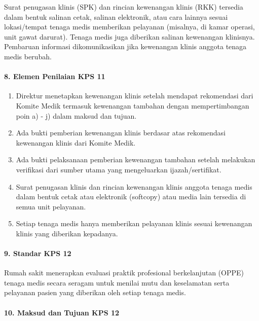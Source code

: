 \documentclass[
]{book}
\providecommand{\tightlist}{%
  \setlength{\itemsep}{0pt}\setlength{\parskip}{0pt}}
\begin{document}
Surat penugasan klinis (SPK) dan rincian kewenangan klinis (RKK) tersedia dalam bentuk salinan cetak, salinan elektronik, atau cara lainnya sesuai lokasi/tempat tenaga medis memberikan pelayanan (misalnya, di kamar operasi, unit gawat darurat). Tenaga medis juga diberikan salinan kewenangan klinisnya.
Pembaruan informasi dikomunikasikan jika kewenangan klinis anggota tenaga medis berubah.

\hypertarget{elemen-penilaian-kps-11}{%
\paragraph*{8. Elemen Penilaian KPS 11}\label{elemen-penilaian-kps-11}}

\begin{enumerate}
\def\labelenumi{\alph{enumi}.}
\tightlist
\item
  Direktur menetapkan kewenangan klinis setelah mendapat rekomendasi dari Komite Medik termasuk kewenangan tambahan dengan mempertimbangan poin a) - j) dalam maksud dan tujuan.
\item
  Ada bukti pemberian kewenangan klinis berdasar atas rekomendasi kewenangan klinis dari Komite Medik.
\item
  Ada bukti pelaksanaan pemberian kewenangan tambahan setelah melakukan verifikasi dari sumber utama yang mengeluarkan ijazah/sertifikat.
\item
  Surat penugasan klinis dan rincian kewenangan klinis anggota tenaga medis dalam bentuk cetak atau elektronik (softcopy) atau media lain tersedia di semua unit pelayanan.
\item
  Setiap tenaga medis hanya memberikan pelayanan klinis sesuai kewenangan klinis yang diberikan kepadanya.
\end{enumerate}

\hypertarget{standar-kps-12}{%
\paragraph*{9. Standar KPS 12}\label{standar-kps-12}}

Rumah sakit menerapkan evaluasi praktik profesional berkelanjutan (OPPE) tenaga medis secara seragam untuk menilai mutu dan keselamatan serta pelayanan pasien yang diberikan oleh setiap tenaga medis.

\hypertarget{maksud-dan-tujuan-kps-12}{%
\paragraph*{10. Maksud dan Tujuan KPS 12}\label{maksud-dan-tujuan-kps-12}}
\end{document}
